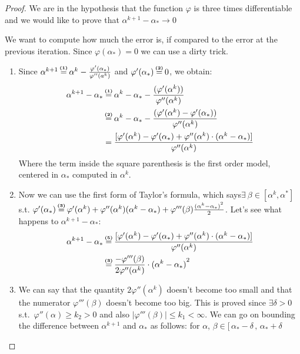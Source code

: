\documentclass[computational_mathematics.tex]{subfiles}
\begin{document}
\begin{proof}
  We are in the hypothesis that the function $\varphi$ is three times differentiable and we would like to prove that $\alpha^{k+1} - \alpha_* \rightarrow 0$

We want to compute how much the error is, if compared to the error at the previous iteration.
  Since $\varphi(\alpha_{*}) = 0$ we can use a dirty trick. 
  \begin{enumerate}
    \item Since $\alpha^{k+1} \numeq{(1)} \alpha^k - \frac{\varphi'({\alpha}_*)}{\varphi''(a^k)}$ and $\varphi'(\alpha_*) \numeq{(2)} 0$, we obtain:
  \begin{equation}
    \begin{split}
      \alpha^{k+1} - \alpha_* & \numeq{(1)} \alpha^k - \alpha_* - \frac{(\varphi'(\alpha^k))}{\varphi''(\alpha^k)}\\
      & \numeq{(2)} \alpha^k - \alpha_* - \frac{(\varphi'(\alpha^k) - \varphi'(\alpha_*))}{\varphi''(\alpha^k)}\\
      & = \frac{[\varphi'(\alpha^k) -\varphi'(\alpha_*) + \varphi''(\alpha^k) \cdot (\alpha^k - \alpha_*)]}{\varphi''(\alpha^k)} 
    \end{split}
  \end{equation}
 Where the term inside the square parenthesis  is the first order model, centered in $\alpha_*$ computed in $\alpha^k$.
  \item Now we can use the first form of Taylor's formula, which says$\exists ~ \beta \in [\alpha^k, \alpha^*]$ s.t. $\varphi'(\alpha_{*}) \numeq{(3)} \varphi'(\alpha^{k}) + \varphi''(\alpha^{k}) (\alpha^{k} - \alpha_{*}) + \varphi'''(\beta) \frac{{(\alpha^{k} - \alpha_{*})}^{2}}{2}$.
    Let's see what happens to $\alpha^{k+1} - \alpha_*$:
  \begin{equation}
    \begin{split}
      \alpha^{k+1} - \alpha_* & \numeq{(5)} \frac{[\varphi'(\alpha^k) -\varphi'(\alpha_*) + \varphi''(\alpha^k) \cdot (\alpha^k - \alpha_*)]}{\varphi''(\alpha^k)}\\
      & \numeq{(3)} \frac{-\varphi'''(\beta)}{2 \varphi''(\alpha^k)} \cdot {(\alpha^k - \alpha_*)}^2
    \end{split}
  \end{equation}
\item We can say that the quantity $2\varphi''(\alpha^{k})$ doesn't become too small and that the numerator $\varphi'''(\beta)$ doesn't become too big. This is proved since $\exists \delta > 0$ s.t.~$\varphi''(\alpha) \geq k_2 > 0$ and also  $| \varphi'''(\beta) | \leq k_1 < \infty$. We can go on bounding the difference between $\alpha^{k+1}$ and $\alpha_*$ as follows: for $\alpha$, $\beta \in [ \, \alpha_* - \delta \,,\, \alpha_* + \delta$
       

\end{enumerate}
\end{proof}
\end{document}
